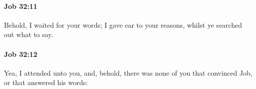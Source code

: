 		\paragraph{Job 32:11} %
			\label{JOB-32-11}

			Behold, I waited for your words; I gave ear to your reasons, whilst ye searched out what to say.


		\paragraph{Job 32:12} %
			\label{JOB-32-12}

			Yea, I attended unto you, and, behold, there was none of you that convinced Job, or that answered his words:


